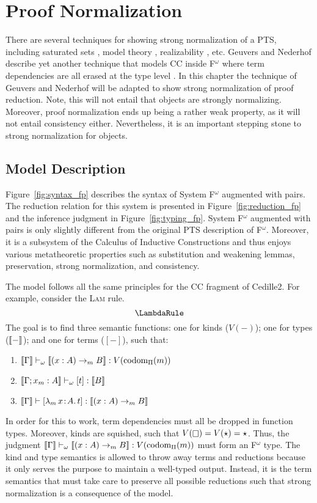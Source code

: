 \chapter{Proof Normalization}


There are several techniques for showing strong normalization of a PTS, including saturated sets \cite{geuvers1994_sn_satset}, model theory \cite{terlouw1995_sn}, realizability \cite{ong1993}, etc.
Geuvers and Nederhof describe yet another technique that models CC inside F$^\omega$ where term dependencies are all erased at the type level \cite{geuvers1991_sn_tof}.
In this chapter the technique of Geuvers and Nederhof will be adapted to show strong normalization of proof reduction.
Note, this will not entail that objects are strongly normalizing.
Moreover, proof normalization ends up being a rather weak property, as it will not entail consistency either.
Nevertheless, it is an important stepping stone to strong normalization for objects.

\section{Model Description}

Figure~\ref{fig:syntax_fp} describes the syntax of System F$^\omega$ augmented with pairs.
The reduction relation for this system is presented in Figure~\ref{fig:reduction_fp} and the inference judgment in Figure~\ref{fig:typing_fp}.
System F$^\omega$ augmented with pairs is only slightly different from the original PTS description of F$^\omega$.
Moreover, it is a subsystem of the Calculus of Inductive Constructions and thus enjoys various metatheoretic properties such as substitution and weakening lemmas, preservation, strong normalization, and consistency.





The model follows all the same principles for the CC fragment of Cedille2.
For example, consider the \textsc{Lam} rule.
$$\LambdaRule$$
The goal is to find three semantic functions: one for kinds ($V(-)$); one for types ($\llbracket - \rrbracket$); and one for terms ($[-]$), such that:
    \begin{enumerate}
        \item $\llbracket \Gamma \rrbracket \vdash_\omega \llbracket (x : A) \to_m B \rrbracket : V(\textnormal{codom}_\Pi(m))$
        \item $\llbracket \Gamma; x_m : A \rrbracket \vdash_\omega [t] : \llbracket B \rrbracket$
        \item $\llbracket \Gamma \rrbracket \vdash [{\lambda_m}\, x\! : \! A.\, t] : \llbracket (x : A) \to_m B \rrbracket$
    \end{enumerate}
In order for this to work, term dependencies must all be dropped in function types.
Moreover, kinds are squished, such that $V(\kind) = V(\star) = \star$.
Thus, the judgment $\llbracket \Gamma \rrbracket \vdash_\omega \llbracket (x : A) \to_m B \rrbracket : V(\textnormal{codom}_\Pi(m))$ must form an F$^\omega$ type.
The kind and type semantics is allowed to throw away terms and reductions because it only serves the purpose to maintain a well-typed output.
Instead, it is the term semantics that must take care to preserve all possible reductions such that strong normalization is a consequence of the model.

